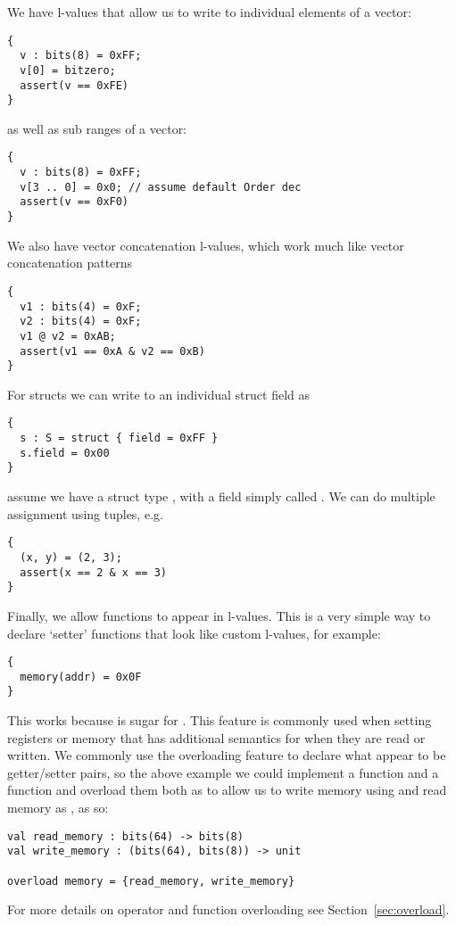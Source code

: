 We have l-values that allow us to write to individual elements of a
vector:
\begin{lstlisting}
{
  v : bits(8) = 0xFF;
  v[0] = bitzero;
  assert(v == 0xFE)
}
\end{lstlisting}
as well as sub ranges of a vector:
\begin{lstlisting}
{
  v : bits(8) = 0xFF;
  v[3 .. 0] = 0x0; // assume default Order dec
  assert(v == 0xF0)
}
\end{lstlisting}
We also have vector concatenation l-values, which work much like
vector concatenation patterns
\begin{lstlisting}
{
  v1 : bits(4) = 0xF;
  v2 : bits(4) = 0xF;
  v1 @ v2 = 0xAB;
  assert(v1 == 0xA & v2 == 0xB)
}
\end{lstlisting}
For structs we can write to an individual struct field as
\begin{lstlisting}
{
  s : S = struct { field = 0xFF }
  s.field = 0x00
}
\end{lstlisting}
assume we have a struct type , with a field simply called
. We can do multiple assignment using tuples, e.g.
\begin{lstlisting}
{
  (x, y) = (2, 3);
  assert(x == 2 & x == 3)
}
\end{lstlisting}

Finally, we allow functions to appear in l-values. This is a very
simple way to declare `setter' functions that look like custom
l-values, for example:
\begin{lstlisting}
{
  memory(addr) = 0x0F
}
\end{lstlisting}
This works because  is sugar for . This
feature is commonly used when setting registers or memory that has
additional semantics for when they are read or written. We commonly
use the overloading feature to declare what appear to be getter/setter
pairs, so the above example we could implement a 
function and a  function and overload them both as
 to allow us to write memory using 
and read memory as , as so:
\begin{lstlisting}
val read_memory : bits(64) -> bits(8)
val write_memory : (bits(64), bits(8)) -> unit

overload memory = {read_memory, write_memory}
\end{lstlisting}
For more details on operator and function overloading see
Section~\ref{sec:overload}.

